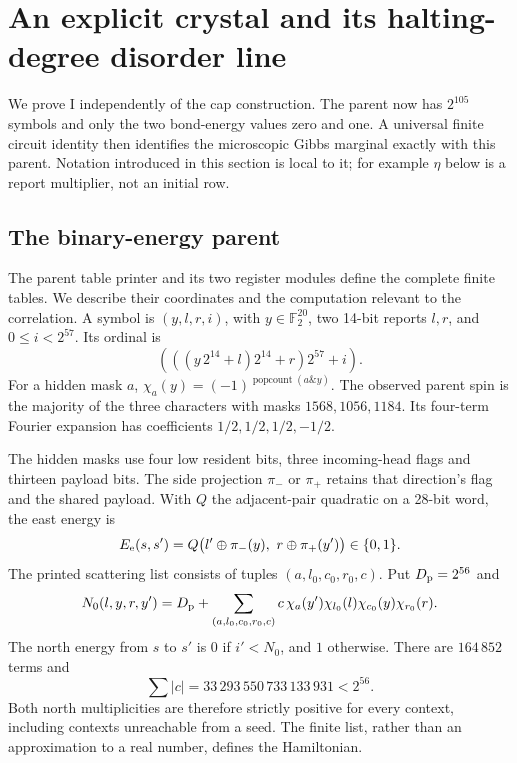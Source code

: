 \section{An explicit crystal and its halting-degree disorder line}\label{sec:explicit-crystal}

We prove I independently of the cap construction. The parent now has \(2^{105}\) symbols and only the two bond-energy values zero and one. A universal finite circuit identity then identifies the microscopic Gibbs marginal exactly with this parent. Notation introduced in this section is local to it; for example \(\eta\) below is a report multiplier, not an initial row.

\subsection{The binary-energy parent}\label{sec:binary-parent}

The parent table printer and its two register modules define the complete finite tables. We describe their coordinates and the computation relevant to the correlation. A symbol is \((y,l,r,i)\), with \(y\in\mathbb F_2^{20}\), two 14-bit reports \(l,r\), and \(0\le i<2^{57}\). Its ordinal is
\[
 (((y\,2^{14}+l)2^{14}+r)2^{57}+i).
\]
For a hidden mask \(a\), \(\chi_a(y)=(-1)^{\operatorname{popcount}(a\mathbin{\&}y)}\). The observed parent spin is the majority of the three characters with masks \(1568,1056,1184\). Its four-term Fourier expansion has coefficients \(1/2,1/2,1/2,-1/2\).

The hidden masks use four low resident bits, three incoming-head flags and thirteen payload bits. The side projection \(\pi_-\) or \(\pi_+\) retains that direction's flag and the shared payload. With \(Q\) the adjacent-pair quadratic on a 28-bit word, the east energy is
\[
 E_{\rm e}(s,s')=Q\bigl(l'\oplus\pi_-(y),\ r\oplus\pi_+(y')\bigr)\in\{0,1\}.
\]
The printed scattering list consists of tuples \((a,l_0,c_0,r_0,c)\). Put \(D_{\rm p}=2^{56}\) and
\begin{equation}\label{eq:binary-threshold}
 N_0(l,y,r,y')=D_{\rm p}+\sum_{(a,l_0,c_0,r_0,c)}
 c\,\chi_a(y')\chi_{l_0}(l)\chi_{c_0}(y)\chi_{r_0}(r).
\end{equation}
The north energy from \(s\) to \(s'\) is \(0\) if \(i'<N_0\), and \(1\) otherwise. There are \(164\,852\) terms and
\begin{equation}\label{eq:binary-norm}
 \sum |c|=33\,293\,550\,733\,133\,931<2^{56}.
\end{equation}
Both north multiplicities are therefore strictly positive for every context, including contexts unreachable from a seed. The finite list, rather than an approximation to a real number, defines the Hamiltonian.

